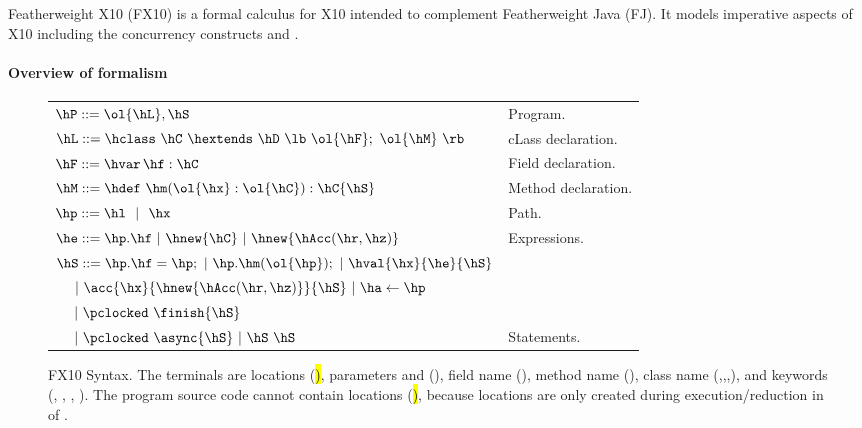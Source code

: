 Featherweight X10 (FX10) is a formal calculus for X10 intended to  complement Featherweight Java
(FJ).  It models imperative aspects of X10 including the concurrency
constructs \hfinish{} and \hasync{}.


\paragraph{Overview of formalism}

\begin{figure}[htpb!]
\begin{center}
\begin{tabular}{|l|l|}
\hline

$\hP ::= \ol{\hL},\hS$ & Program. \\

$\hL ::= \hclass ~ \hC~\hextends~\hD~\lb~\ol{\hF};~\ol{\hM}~\rb$
& cLass declaration. \\

$\hF ::= \hvar\,\hf:\hC$
& Field declaration. \\

$\hM ::= \hdef\ \hm(\ol{\hx}:\ol{\hC}):\hC\{\hS\}$
& Method declaration. \\

$\hp ::= \hl ~~|~~ \hx$
& Path. \\ %

$\he ::=  \hp.\hf  ~|~ \hnew{\hC} ~|~ \hnew{\hAcc(\hr,\hz)}$
& Expressions. \\ %

$\hS ::=  \hp.\hf = \hp; ~|~ \hp.\hm(\ol{\hp});  ~|~ \hval{\hx}{\he}{\hS}$ &\\
$~~~~|~\acc{\hx}{\hnew{\hAcc(\hr,\hz)}}{\hS} ~|~ \ha \leftarrow \hp$ &\\
$~~~~|~ \pclocked~\finish{\hS}$&\\
$~~~~|~ \pclocked~\async{\hS} ~|~ \hS~\hS$
& Statements. \\ %

\hline
\end{tabular}
\end{center}
\caption{FX10 Syntax.
    The terminals are locations (\hl), parameters and \hthis (\hx), field name (\hf), method name (\hm), class name (\hB,\hC,\hD,\hObject),
        and keywords (\hhnew, \hfinish, \hasync, ).
    The program source code cannot contain locations (\hl), because locations are only created during execution/reduction in  of .
    }
\label{Figure:syntax}
\end{figure}

